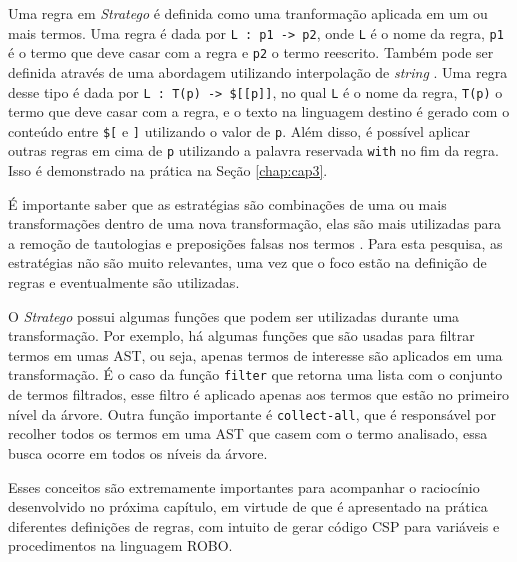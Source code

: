 Uma regra em \textit{Stratego} é definida como uma tranformação aplicada em um ou mais termos. Uma regra é dada por \texttt{L : p1 -> p2}, onde \texttt{L} é o nome da regra, \texttt{p1} é o termo que deve casar com a regra e \texttt{p2} o termo reescrito. Também pode ser definida através de uma abordagem utilizando interpolação de \textit{string} \cite{KatsSpoofax}. Uma regra desse tipo é dada por \texttt{L : T(p) -> \$[[p]]}, no qual \texttt{L} é o nome da regra, \texttt{T(p)} o termo que deve casar com a regra, e o texto na linguagem destino é gerado com o conteúdo entre \texttt{\$[} e \texttt{]} utilizando o valor de \texttt{p}. Além disso, é possível aplicar outras regras em cima de \texttt{p} utilizando a palavra reservada \texttt{with} no fim da regra. Isso é demonstrado na prática na Seção \ref{chap:cap3}.

É importante saber que as estratégias são combinações de uma ou mais transformações dentro de uma nova transformação, elas são mais utilizadas para a remoção de tautologias e preposições falsas nos termos \cite{KatsSpoofax}. Para esta pesquisa, as estratégias não são muito relevantes, uma vez que o foco estão na definição de regras e eventualmente são utilizadas.

O \textit{Stratego} possui algumas funções que podem ser utilizadas durante uma transformação. Por exemplo, há algumas funções que são usadas para filtrar termos em umas AST, ou seja, apenas termos de interesse são aplicados em uma transformação. É o caso da função \texttt{filter} que retorna uma lista com o conjunto de termos filtrados, esse filtro é aplicado apenas aos termos que estão no primeiro nível da árvore. Outra função importante é \texttt{collect-all}, que é responsável por recolher todos os termos em uma AST que casem com o termo analisado, essa busca ocorre em todos os níveis da árvore.

Esses conceitos são extremamente importantes para acompanhar o raciocínio desenvolvido no próxima capítulo, em virtude de que é apresentado na prática diferentes definições de regras, com intuito de gerar código CSP para variáveis e procedimentos na linguagem ROBO.